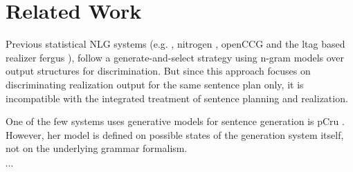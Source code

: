\section{Related Work}
\label{sec:related}


Previous statistical NLG systems (e.g. , {\sc nitrogen} \cite{langkildeknight1998}, {\sc openCCG} \cite{whitebaldridge2003}
and the {\sc ltag} based realizer {\sc fergus} \cite{bangalorerambow2000}), follow a generate-and-select strategy using n-gram models over output structures
for discrimination. But since this approach focuses on discriminating realization output for the same sentence plan only, it is incompatible with the
integrated treatment of sentence planning and realization.

One of the few systems uses generative models for sentence generation is {\sc pCru} . However, her model is defined on possible states of the generation system itself, not on the underlying grammar formalism. 

$\cdots$
